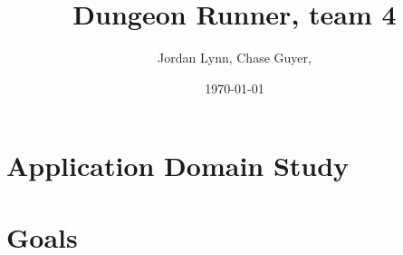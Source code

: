 \documentclass[11pt]{article}
\begin{document}
    \title{Dungeon Runner, team 4}
    \author{Jordan Lynn, Chase Guyer, }

    \date{\today}
    \maketitle

    \section{Application Domain Study}
    
    \section{}
    
    \section{Goals}
    
    \section{}
\end{document}
